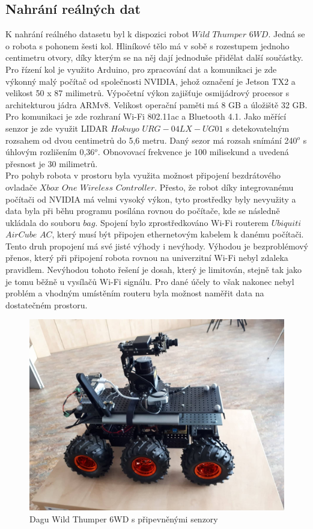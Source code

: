\documentclass[12pt]{report}
\begin{document}
\subsection{Nahrání reálných dat}
K nahrání reálného datasetu byl k dispozici robot $Wild$ $Thumper$ $6WD$. Jedná se o robota s pohonem šesti kol. Hliníkové tělo má v sobě s rozestupem jednoho centimetru otvory, díky kterým se na něj dají jednoduše přidělat další součástky. \\
\indent Pro řízení kol je využito Arduino, pro zpracování dat a komunikaci je zde výkonný malý počítač od společnosti NVIDIA, jehož označení je Jetson TX2 a velikost 50 x 87 milimetrů. Výpočetní výkon zajišťuje osmijádrový procesor s architekturou jádra ARMv8. Velikost operační paměti má 8 GB a úložiště 32 GB. Pro komunikaci je zde rozhraní Wi-Fi 802.11ac a Bluetooth 4.1. Jako měřící senzor je zde využit LIDAR $Hokuyo$ $URG-04LX-UG01$ s detekovatelným rozsahem od dvou centimetrů do 5,6 metru. Daný sezor má rozsah snímání 240$^o$ s úhlovým rozlišením 0,36$^o$. Obnovovací frekvence je 100 milisekund a uvedená přesnost je 30 milimetrů.\\
\indent Pro pohyb robota v prostoru byla využita možnost připojení bezdrátového ovladače $Xbox$ $One$ $Wireless$ $Controller$. Přesto, že robot díky integrovanému počítači od NVIDIA má velmi vysoký výkon, tyto prostředky byly nevyužity a data byla při běhu programu posílána rovnou do počítače, kde se následně ukládala do souboru $bag$. Spojení bylo zprostředkováno Wi-Fi routerem $Ubiquiti$ $AirCube$ $AC$, který musí být připojen ethernetovým kabelem k danému počítači. Tento druh propojení má své jisté výhody i nevýhody. Výhodou je bezproblémový přenos, který při připojení robota rovnou na univerzitní Wi-Fi nebyl zdaleka pravidlem. Nevýhodou tohoto řešení je dosah, který je limitován, stejně tak jako je tomu běžně u vysílačů Wi-Fi signálu. Pro dané účely to však nakonec nebyl problém a vhodným umístěním routeru byla možnost naměřit data na dostatečném prostoru. 

\begin{figure}[!ht]
	\begin{center}
		\includegraphics[width=0.7\columnwidth]{imgs/robot.jpg}
	\end{center}
	\caption{Dagu Wild Thumper 6WD s připevněnými senzory}
	\label{fig:robot}
\end{figure}
\end{document}
